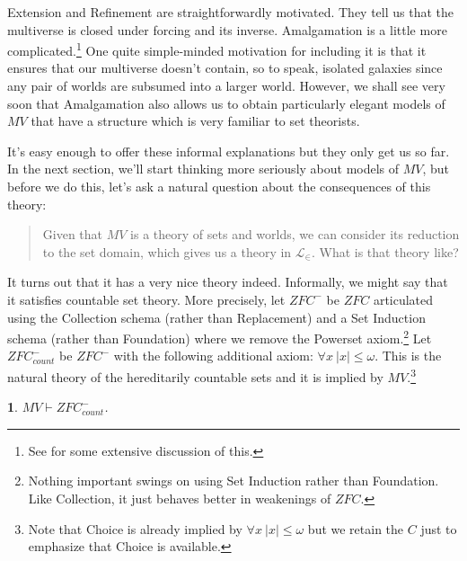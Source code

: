 \documentclass[10pt,a4paper]{amsart}
\numberwithin{equation}{section}
\numberwithin{figure}{section}
\theoremstyle{plain}
\newtheorem{thm}{\protect\theoremname}
\theoremstyle{plain}
\theoremstyle{plain}
\theoremstyle{plain}
\theoremstyle{remark}
\theoremstyle{plain}
\theoremstyle{definition}
\providecommand{\theoremname}{Theorem}
\begin{document}
Extension and Refinement are straightforwardly motivated. They tell
us that the multiverse is closed under forcing and its inverse. Amalgamation
is a little more complicated.\footnote{See \citet{MeadMadPGMV} for some extensive discussion of this. }
One quite simple-minded motivation for including it is that it ensures
that our multiverse doesn't contain, so to speak, isolated galaxies
since any pair of worlds are subsumed into a larger world. However,
we shall see very soon that Amalgamation also allows us to obtain
particularly elegant models of $MV$ that have a structure which is
very familiar to set theorists. 

It's easy enough to offer these informal explanations but they only
get us so far. In the next section, we'll start thinking more seriously
about models of $MV$, but before we do this, let's ask a natural
question about the consequences of this theory: 
\begin{quote}
Given that $MV$ is a theory of sets and worlds, we can consider its
reduction to the set domain, which gives us a theory in $\mathcal{L}_{\in}$.
What is that theory like?
\end{quote}
It turns out that it has a very nice theory indeed. Informally, we
might say that it satisfies countable set theory. More precisely,
let $ZFC^{-}$ be $ZFC$ articulated using the Collection schema (rather
than Replacement) and a Set Induction schema (rather than Foundation)
where we remove the Powerset axiom.\footnote{Nothing important swings on using Set Induction rather than Foundation.
Like Collection, it just behaves better in weakenings of $ZFC$.} Let $ZFC_{count}^{-}$ be $ZFC^{-}$ with the following additional
axiom: $\forall x\ |x|\leq\omega$. This is the natural theory of
the hereditarily countable sets and it is implied by $MV$.\footnote{Note that Choice is already implied by $\forall x\ |x|\leq\omega$
but we retain the $C$ just to emphasize that Choice is available. }
\begin{thm}
$MV\vdash ZFC_{count}^{-}$.\label{thm:MV|-ZFC_count}
\end{thm}
\end{document}
